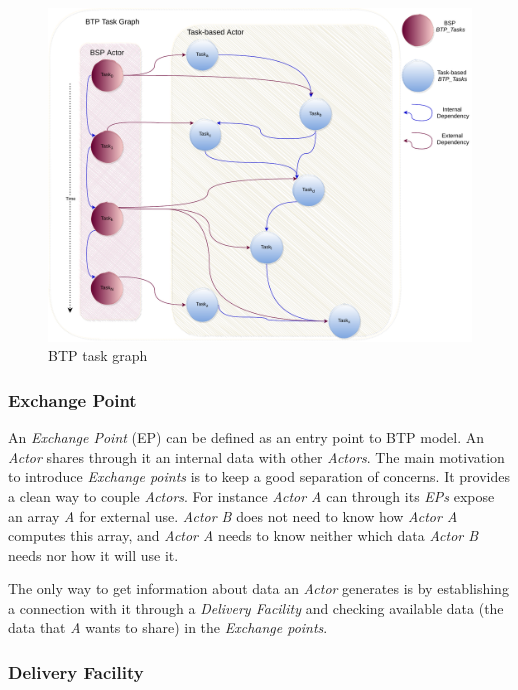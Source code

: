 \begin{figure}[tb]\centering
\includegraphics[width=0.75\columnwidth]{figures/BTPTaskGraph.pdf}
\caption{BTP task graph}
\label{figWUG}
\end{figure}

\subsubsection{Exchange Point}\label{EP}

An \textit{Exchange Point} (EP) can be defined as an entry point to BTP model. An \textit{Actor} shares through it an internal data with other \textit{Actors}. The main motivation to introduce \textit{Exchange points} is to keep a good separation of concerns. It provides a clean way to couple \textit{Actors}. For instance \textit{Actor A} can through its \textit{EPs} expose an array \textit{A} for external use. \textit{Actor B} does not need to know how \textit{Actor A} computes this array, and \textit{Actor A} needs to know neither which data \textit{Actor B} needs nor how it will use it.

The only way to get information about data an \textit{Actor} generates is by establishing a connection with it through a \textit{Delivery Facility} and checking available data (the data that \textit{A} wants to share) in the \textit{Exchange points}.

\subsubsection{Delivery Facility}\label{DF}

